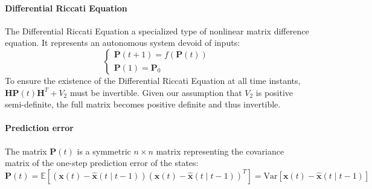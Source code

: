 \paragraph*{Differential Riccati Equation}
The Differential Riccati Equation a specialized type of nonlinear matrix difference equation. 
It represents an autonomous system devoid of inputs:
\[\begin{cases}
    \mathbf{P}(t+1)=f(\mathbf{P}(t)) \\
    \mathbf{P}(1)=\mathbf{P}_0
\end{cases}\]
To ensure the existence of the Differential Riccati Equation at all time instants, $\mathbf{HP}(t)\mathbf{H}^T+V_2$ must be invertible. 
Given our assumption that $V_2$ is positive semi-definite, the full matrix becomes positive definite and thus invertible.

\paragraph*{Prediction error}
The matrix $\mathbf{P}(t)$ is a symmetric $n \times n$  matrix representing the covariance matrix of the one-step prediction error of the states:
\[\mathbf{P}(t)=\mathbb{E}\left[\left(\mathbf{x}(t)-\hat{\mathbf{x}}(t\mid t-1)\right)\left(\mathbf{x}(t)-\hat{\mathbf{x}}(t\mid t-1)\right)^T\right]=\text{Var}\left[\mathbf{x}(t)-\hat{\mathbf{x}}(t\mid t-1)\right]\]

